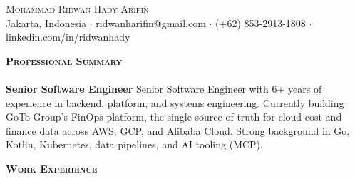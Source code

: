 \documentclass[a4paper]{article}
\newcommand{\lineunder} {
    \vspace*{-8pt} \\
    \hspace*{-18pt} \hrulefill \\
}
\newcommand{\header} [1] {
    {\hspace*{-18pt}\vspace*{6pt} \large \textbf{\textsc{#1}}}
    \vspace*{-6pt} \lineunder
}
\begin{document}
\vspace*{-40pt}

\vspace*{-10pt}
\begin{center}
	{\Huge \scshape{Mohammad Ridwan Hady Arifin}}\\
	Jakarta, Indonesia $\cdot$ ridwanharifin@gmail.com $\cdot$ (+62) 853-2913-1808 $\cdot$ linkedin.com/in/ridwanhady\\
\end{center}

\header{Professional Summary}
\textbf{Senior Software Engineer}
\newline
Senior Software Engineer with 6+ years of experience in backend, platform, and systems engineering. Currently building GoTo Group's FinOps platform, the single source of truth for cloud cost and finance data across AWS, GCP, and Alibaba Cloud. Strong background in Go, Kotlin, Kubernetes, data pipelines, and AI tooling (MCP).
\vspace{2mm}

\header{Work Experience}
\vspace{1mm}
\end{document}
